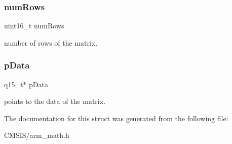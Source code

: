 \subsubsection{\texorpdfstring{numRows}{numRows}}
{\footnotesize\ttfamily uint16\+\_\+t num\+Rows}

number of rows of the matrix. \mbox{\label{structarm__matrix__instance__q15_a817ede38365e63e561a12069c6c5c087}} 
\subsubsection{\texorpdfstring{pData}{pData}}
{\footnotesize\ttfamily q15\+\_\+t$\ast$ p\+Data}

points to the data of the matrix. 

The documentation for this struct was generated from the following file\+:\begin{DoxyCompactItemize}
\item 
C\+M\+S\+I\+S/arm\+\_\+math.\+h\end{DoxyCompactItemize}
